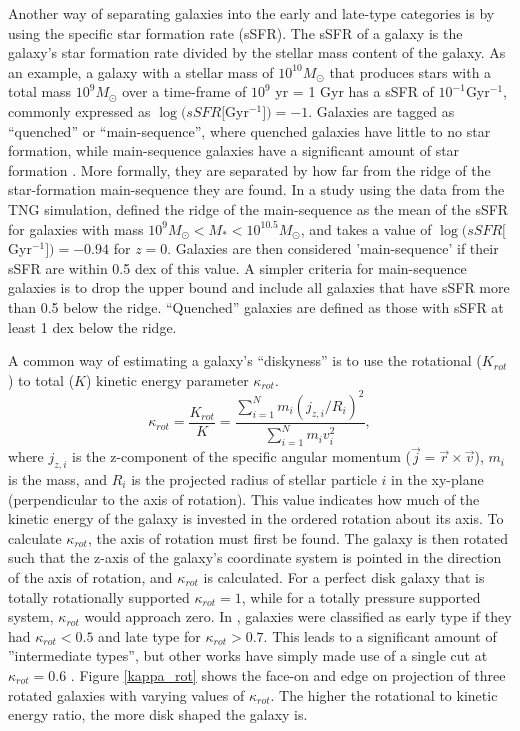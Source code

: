 Another way of separating galaxies into the early and late-type categories is by using the specific star formation rate (sSFR). The sSFR of a galaxy is the galaxy's star formation rate divided by the stellar mass content of the galaxy. As an example, a galaxy with a stellar mass of $10^{10} M_\odot$ that produces stars with a total mass $10^9 M_\odot$ over a time-frame of $10^9$ yr = 1 Gyr has a sSFR of $10^{-1} $Gyr$^{-1}$, commonly expressed as $\log(sSFR[$Gyr$^{-1}]) = -1$. Galaxies are tagged as ``quenched'' or ``main-sequence'', where quenched galaxies have little to no star formation, while main-sequence galaxies have a significant amount of star formation \parencite{Noeske2007}. More formally, they are separated by how far from the ridge of the star-formation main-sequence they are found. In a study using the data from the TNG simulation, \textcite{Genel2017} defined the ridge of the main-sequence as the mean of the sSFR for galaxies with mass $10^{9} M_{\odot} < M_* < 10^{10.5} M_{\odot}$, and takes a value of $\log (sSFR[$Gyr$^{-1}]) = -0.94$ for $z=0$. Galaxies are then considered 'main-sequence' if their sSFR are within 0.5 dex of this value. A simpler criteria for main-sequence galaxies is to drop the upper bound and include all galaxies that have sSFR more than 0.5 below the ridge. ``Quenched'' galaxies are defined as those with sSFR at least 1 dex below the ridge. 

A common way of estimating a galaxy's ``diskyness'' is to use the rotational ($K_{rot}$) to total ($K$) kinetic energy parameter $\kappa_{rot}$. 
\begin{equation}
    \kappa_{rot} = \frac{K_{rot}}{K} = \frac{\sum_{i=1}^{N} m_i (j_{z, i}/R_i)^2}{\sum_{i=1}^{N} m_i v_i^2},
\end{equation}
where $j_{z, i}$ is the z-component of the specific angular momentum ($\vec{j} = \vec{r} \times \vec{v}$), $m_i$ is the mass, and $R_i$ is the projected radius of stellar particle $i$ in the xy-plane (perpendicular to the axis of rotation). 
This value indicates how much of the kinetic energy of the galaxy is invested in the ordered rotation about its axis. To calculate $\kappa_{rot}$, the axis of rotation must first be found. The galaxy is then rotated such that the z-axis of the galaxy's coordinate system is pointed in the direction of the axis of rotation, and $\kappa_{rot}$ is calculated.
For a perfect disk galaxy that is totally rotationally supported $\kappa_{rot} = 1$, while for a totally pressure supported system, $\kappa_{rot}$ would approach zero. In \textcite{Sales2012}, galaxies were classified as early type if they had $\kappa_{rot} < 0.5$ and late type for $\kappa_{rot} > 0.7$. This leads to a significant amount of ''intermediate types'', but other works have simply made use of a single cut at $\kappa_{rot} = 0.6$ \parencite{Ferrero2020}. Figure \ref{kappa_rot} shows the face-on and edge on projection of three rotated galaxies with varying values of $\kappa_{rot}$. The higher the rotational to kinetic energy ratio, the more disk shaped the galaxy is.


